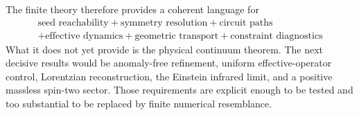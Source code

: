 \documentclass[11pt]{article}
\theoremstyle{definition}
\theoremstyle{remark}
\begin{document}
The finite theory therefore provides a coherent language for
\[
\boxed{
\begin{gathered}
\text{seed reachability}
+
\text{symmetry resolution}
+
\text{circuit paths}\\
+
\text{effective dynamics}
+
\text{geometric transport}
+
\text{constraint diagnostics}
\end{gathered}
}
\]
What it does not yet provide is the physical continuum theorem. The next decisive results would be anomaly-free refinement, uniform effective-operator control, Lorentzian reconstruction, the Einstein infrared limit, and a positive massless spin-two sector. Those requirements are explicit enough to be tested and too substantial to be replaced by finite numerical resemblance.
\end{document}
